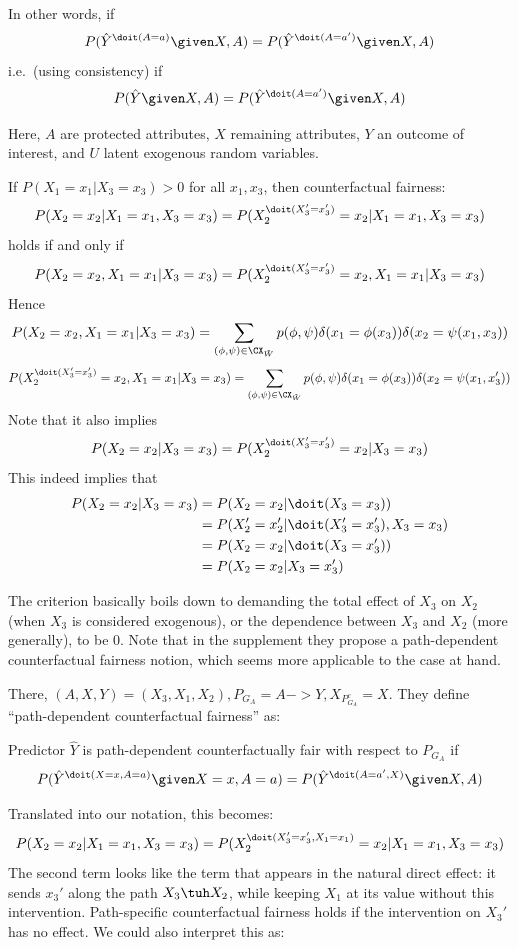 {\begin{Def}
  In other words, if
  $$P(\hat Y^{\doit(A=a)} \given X, A) = P(\hat Y^{\doit(A=a')} \given X, A)$$
  i.e.\ (using consistency) if
  $$P(\hat Y \given X, A) = P(\hat Y^{\doit(A=a')} \given X, A)$$

  Here, $A$ are protected attributes, $X$ remaining attributes, $Y$ an outcome of interest, and $U$ latent exogenous random variables.
\end{Def}

If $P(X_1=x_1|X_3=x_3)>0$ for all $x_1,x_3$, then
counterfactual fairness:
$$P(X_2=x_2 |X_1=x_1, X_3=x_3)=P(X_2^{\doit(X_3'=x_3')}=x_2| X_1=x_1,X_3=x_3)$$
holds if and only if
$$P(X_2=x_2,X_1=x_1|X_3=x_3)=P(X_2^{\doit(X_3'=x_3')}=x_2,X_1=x_1|X_3=x_3)$$
Hence
$$P(X_2=x_2, X_1=x_1 | X_3=x_3) = \sum_{(\phi,\psi) \in \CX_{\tilde{W}}} p(\phi,\psi) \delta(x_1=\phi(x_3)) \delta(x_2=\psi(x_1,x_3))$$
$$P(X_2^{\doit(X_3'=x_3')}=x_2, X_1=x_1|X_3=x_3) = \sum_{(\phi,\psi) \in \CX_{\tilde{W}}} p(\phi,\psi) \delta(x_1=\phi(x_3)) \delta(x_2=\psi(x_1,x_3'))$$
Note that it also implies
$$P(X_2=x_2|X_3=x_3)=P(X_2^{\doit(X_3'=x_3')}=x_2|X_3=x_3)$$
This indeed implies that
\begin{equation*}\begin{split}
  P(X_2=x_2|X_3=x_3)
  &=P(X_2=x_2|\doit(X_3=x_3)) \\
  &=P(X_2'=x_2'|\doit(X_3'=x_3'),X_3=x_3) \\
  &=P(X_2=x_2|\doit(X_3=x_3')) \\
  &=P(X_2=x_2|X_3=x_3')
\end{split}\end{equation*}}

The criterion basically boils down to demanding the total effect of $X_3$ on $X_2$ (when $X_3$ is considered exogenous), or the dependence between $X_3$ and $X_2$ (more generally), to be 0.
Note that in the supplement they propose a path-dependent counterfactual fairness notion, which seems more applicable to the case at hand.

There, $(A,X,Y) = (X_3,X_1,X_2), P_{G_A} = A->Y, X_{P_{G_A}^c} = X$.
They define ``path-dependent counterfactual fairness'' as:
\begin{Def}
  Predictor $\hat Y$ is path-dependent counterfactually fair with respect to $P_{G_A}$ if
  $$P(\hat Y^{\doit(X=x,A=a)} \given X=x,A=a) = P(\hat Y^{\doit(A=a',X)} \given X, A)$$
\end{Def}
Translated into our notation, this becomes:
$$P(X_2=x_2 |X_1=x_1, X_3=x_3)=P(X_2^{\doit(X_3'=x_3',X_1=x_1)}=x_2| X_1=x_1,X_3=x_3)$$
The second term looks like the term that appears in the natural direct effect: it sends
$x_3'$ along the path $X_3 \tuh X_2$, while keeping $X_1$ at its value without this intervention.
Path-specific counterfactual fairness holds if the intervention on $X_3'$ has no effect. 
We could also interpret this as:

